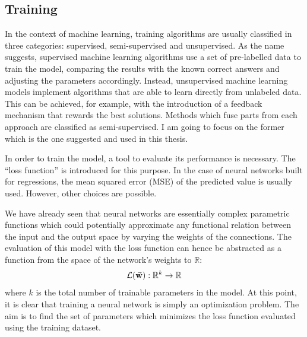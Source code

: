 \documentclass[a4paper,10pt]{report}
\begin{document}
\subsection{Training}

In the context of machine learning, training algorithms are usually classified in three categories: 
supervised, semi-supervised and unsupervised.
As the name suggests, supervised machine learning algorithms use a set of pre-labelled data to 
train the model, comparing the results with the known correct answers and adjusting the parameters 
accordingly.
Instead, unsupervised machine learning models implement algorithms that are able to learn directly from 
unlabeled data. This can be achieved, for example, with the introduction of a feedback mechanism that rewards
the best solutions.
Methods which fuse parts from each approach are classified as semi-supervised. I am going to focus on the
former which is the one suggested and used in this thesis.

In order to train the model, a tool to evaluate its performance is necessary.
The ``loss function'' is introduced for this purpose. In the case of neural networks built for 
regressions, the mean squared error (MSE) of the predicted value
is usually used. However, other choices are possible.

We have already seen that neural networks are essentially complex parametric functions
which could potentially approximate any functional relation between the input and the
output space by varying the weights of the connections. The evaluation of this model
with the loss function can hence be abstracted as a function from the space of the 
network's weights to $\mathbb{R}$:
\begin{equation}
    \mathcal{L}(\va{w}): \mathbb{R}^k \rightarrow \mathbb{R}
\end{equation}
where $k$ is the total number of trainable parameters in the model.
At this point, it is clear that 
training a neural network is simply an optimization problem.
The aim is to find the set of parameters which minimizes the loss function evaluated using 
the training dataset.
\end{document}
